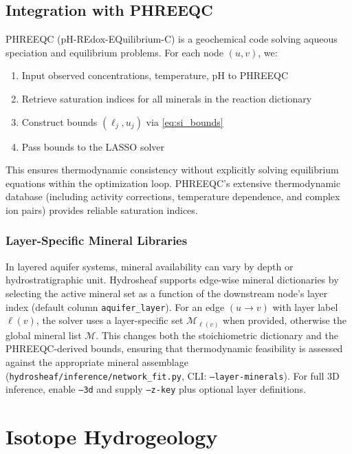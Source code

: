 \documentclass[12pt,a4paper]{article}
\theoremstyle{plain}
\theoremstyle{definition}
\theoremstyle{remark}
\begin{document}
\subsection{Integration with PHREEQC}

PHREEQC (pH-REdox-EQuilibrium-C) is a geochemical code solving aqueous speciation and equilibrium problems. For each node $(u, v)$, we:
\begin{enumerate}
	\item Input observed concentrations, temperature, pH to PHREEQC
	\item Retrieve saturation indices for all minerals in the reaction dictionary
	\item Construct bounds $(\ell_j, u_j)$ via \eqref{eq:si_bounds}
	\item Pass bounds to the LASSO solver
\end{enumerate}

This ensures thermodynamic consistency without explicitly solving equilibrium equations within the optimization loop. PHREEQC's extensive thermodynamic database (including activity corrections, temperature dependence, and complex ion pairs) provides reliable saturation indices.

\subsubsection{Layer-Specific Mineral Libraries}

In layered aquifer systems, mineral availability can vary by depth or hydrostratigraphic unit. Hydrosheaf supports edge-wise mineral dictionaries by selecting the active mineral set as a function of the downstream node's layer index (default column \texttt{aquifer\_layer}). For an edge $(u\to v)$ with layer label $\ell(v)$, the solver uses a layer-specific set $\mathcal{M}_{\ell(v)}$ when provided, otherwise the global mineral list $\mathcal{M}$. This changes both the stoichiometric dictionary and the PHREEQC-derived bounds, ensuring that thermodynamic feasibility is assessed against the appropriate mineral assemblage (\texttt{hydrosheaf/inference/network\_fit.py}, CLI: \texttt{--layer-minerals}). For full 3D inference, enable \texttt{--3d} and supply \texttt{--z-key} plus optional layer definitions.

\newpage
\section{Isotope Hydrogeology}\label{sec:isotope}
\end{document}
